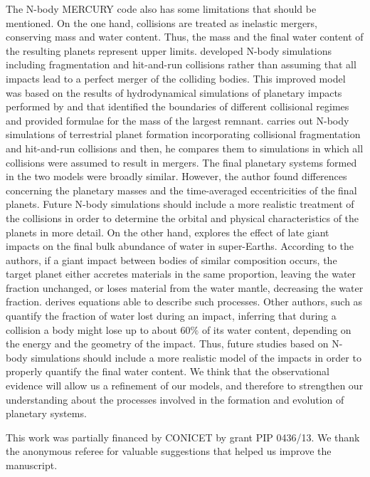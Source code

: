 \documentclass{aa}
\begin{document}
The N-body MERCURY code also has some limitations that should be mentioned. On the one hand, collisions are treated as inelastic
mergers, conserving mass and water content. Thus, the mass and the final water content of the resulting planets represent upper limits.
\citet{Chambers2013} developed N-body simulations including fragmentation
and hit-and-run collisions rather than assuming that all impacts lead to a perfect merger of the colliding bodies. This improved model
was based on the results of hydrodynamical simulations of planetary impacts performed by \citet{Leinhardt2012} and \citet{Genda2012} that identified the boundaries of different collisional regimes and provided formulae for the mass
of the largest remnant. \citet{Chambers2013} carries out N-body simulations of terrestrial planet formation incorporating collisional fragmentation and hit-and-run collisions and then, he compares them to simulations in which all collisions were assumed to result in mergers. The final planetary systems formed in the two models were broadly similar. However, the author
found differences concerning the planetary masses and the time-averaged eccentricities of the final planets. Future N-body
simulations should include a more realistic treatment of the collisions in order to determine the orbital and physical characteristics
of the planets in more detail. On the other hand, \citet{Marcus2010} explores the effect of late giant impacts on
the final bulk abundance of water in super-Earths. According to the authors, if a giant impact between bodies of similar
composition occurs, the target planet either accretes materials in the same proportion, leaving the water fraction unchanged, or
loses material from the water mantle, decreasing the water fraction. \citet{Marcus2010} derives equations able to describe such processes. Other authors, such as \citet{Dvorak2015} quantify the fraction of water lost during an impact, inferring that during a collision a body might lose up to about 60$\%$ of its water content, depending on the energy and the geometry of the impact. Thus, future studies based on N-body simulations should include a more realistic model of the impacts in order to properly quantify the final water content.
We think that the observational evidence will allow us a refinement of our models, and therefore to strengthen our understanding
about the processes involved in the formation and evolution of planetary systems.

\begin{acknowledgements}
This work was partially financed by CONICET by grant PIP 0436/13. We thank the anonymous referee for valuable suggestions that helped
us improve the manuscript.
\end{acknowledgements}

\end{document}
